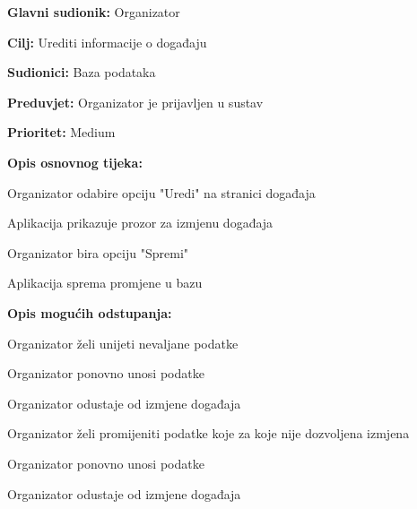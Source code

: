 \noindent {}
	\begin{packed_item}
		
		\item \textbf{Glavni sudionik:} Organizator
		\item \textbf{Cilj:} Urediti informacije o događaju
		\item \textbf{Sudionici:} Baza podataka
		\item \textbf{Preduvjet:} Organizator je prijavljen u sustav
		\item \textbf{Prioritet:} Medium
		\item \textbf{Opis osnovnog tijeka:} 
		
		\item[] \begin{packed_enum}
			
			\item Organizator odabire opciju "Uredi" na stranici događaja
			\item Aplikacija prikazuje prozor za izmjenu događaja
			\item Organizator bira opciju "Spremi"
			\item Aplikacija sprema promjene u bazu
		\end{packed_enum}
	
		\item  \textbf{Opis mogućih odstupanja:}
		\item[] \begin{packed_item}
			
			\item[3.a] Organizator želi unijeti nevaljane podatke
			\item[] \begin{packed_enum}
				\item Organizator ponovno unosi podatke
				\item Organizator odustaje od izmjene događaja
			\end{packed_enum}
		
			\item[3.b] Organizator želi promijeniti podatke koje za koje nije dozvoljena izmjena
			\item[] \begin{packed_enum}
				\item Organizator ponovno unosi podatke
				\item Organizator odustaje od izmjene događaja
			\end{packed_enum}
			
		\end{packed_item}
	\end{packed_item}
				
